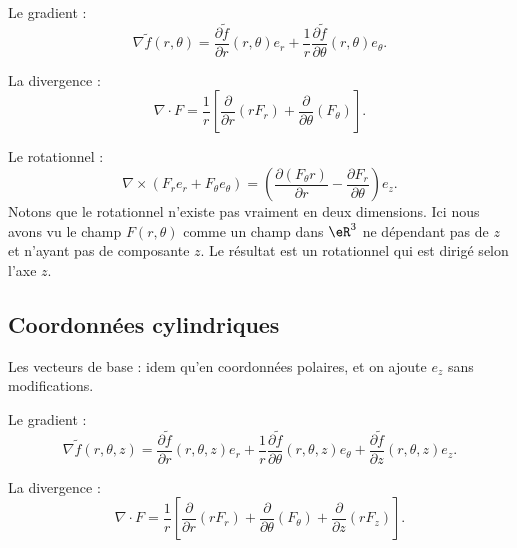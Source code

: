 Le gradient :
\begin{equation}
	\nabla\tilde f(r,\theta)=\frac{ \partial \tilde f }{ \partial r }(r,\theta)e_r+\frac{1}{ r }\frac{ \partial \tilde f }{ \partial \theta }(r,\theta)e_{\theta}.
\end{equation}

La divergence :
\begin{equation}    \label{EqgRxJKd}
	\nabla\cdot F=\frac{1}{ r }\left[ \frac{ \partial  }{ \partial r }(rF_r)+\frac{ \partial  }{ \partial \theta }(F_{\theta}) \right].
\end{equation}

Le rotationnel :
\begin{equation}    \label{EqtBnoCw}
	\nabla\times(F_re_r+F_{\theta}e_{\theta})=\left( \frac{ \partial (F_{\theta} r) }{ \partial r }-\frac{ \partial F_r }{ \partial \theta } \right)e_z.
\end{equation}
Notons que le rotationnel n'existe pas vraiment en deux dimensions. Ici nous avons vu le champ \( F(r,\theta)\) comme un champ dans \( \eR^3\) ne dépendant pas de \( z\) et n'ayant pas de composante \( z\). Le résultat est un rotationnel qui est dirigé selon l'axe \( z\).


\subsection{Coordonnées cylindriques}

Les vecteurs de base : idem qu'en coordonnées polaires, et on ajoute \( e_z\) sans modifications.

Le gradient :
\begin{equation}
	\nabla\tilde f(r,\theta,z)=\frac{ \partial \tilde f }{ \partial r }(r,\theta,z)e_r+\frac{1}{ r }\frac{ \partial \tilde f }{ \partial \theta }(r,\theta,z)e_{\theta}+\frac{ \partial \tilde f }{ \partial z }(r,\theta,z)e_z.
\end{equation}

La divergence :
\begin{equation}
	\nabla\cdot F=\frac{1}{ r }\left[ \frac{ \partial  }{ \partial r }(rF_r)+\frac{ \partial  }{ \partial \theta }(F_{\theta})+\frac{ \partial  }{ \partial z }(rF_z) \right].
\end{equation}

